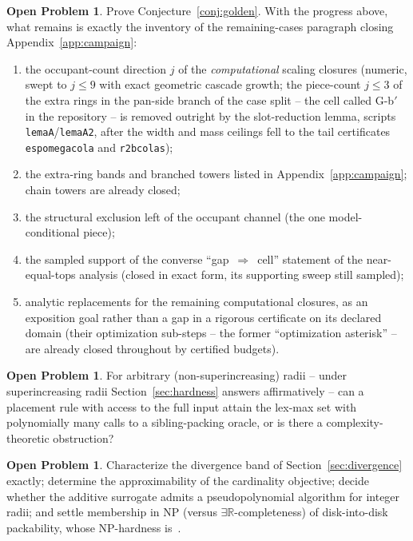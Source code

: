 \documentclass[11pt]{article}
\theoremstyle{definition}
\newtheorem{openproblem}[theorem]{Open Problem}
\begin{document}
\begin{openproblem}\label{op:assembly}
Prove Conjecture~\ref{conj:golden}. With the progress above, what
remains is exactly the inventory of the remaining-cases paragraph
closing Appendix~\ref{app:campaign}:
\begin{enumerate}
\item the occupant-count direction $j$ of the \emph{computational}
scaling closures (numeric, swept to $j\le9$ with exact geometric
cascade growth; the piece-count $j\le3$ of the extra rings in the
pan-side branch of the case split -- the cell called G-b$'$ in the
repository -- is removed outright by the slot-reduction lemma,
scripts \texttt{lemaA}/\texttt{lemaA2}, after the width and mass
ceilings fell to the tail certificates \texttt{espomegacola}
and \texttt{r2bcolas});
\item the extra-ring bands and branched towers listed in
Appendix~\ref{app:campaign}; chain towers are already closed;
\item the structural exclusion left of the occupant channel (the
one model-conditional piece);
\item the sampled support of the converse
``gap~$\Rightarrow$~cell'' statement of the near-equal-tops
analysis (closed in exact form, its supporting sweep still
sampled);
\item analytic replacements for the remaining computational
closures, as an exposition goal rather than a gap in a rigorous
certificate on its declared domain (their optimization sub-steps -- the former
``optimization asterisk'' -- are already closed throughout by
certified budgets).
\end{enumerate}
\end{openproblem}

\begin{openproblem}\label{op:oracle}
For arbitrary (non-superincreasing) radii -- under superincreasing radii
Section~\ref{sec:hardness} answers affirmatively -- can a placement rule
with access to the full input attain the lex-max set with
polynomially many calls to a sibling-packing oracle, or is there a
complexity-theoretic obstruction?
\end{openproblem}

\begin{openproblem}\label{op:misc}
Characterize the divergence band of Section~\ref{sec:divergence} exactly;
determine the approximability of the cardinality objective; decide whether
the additive surrogate admits a pseudopolynomial algorithm for integer
radii; and settle membership in NP (versus
$\exists\mathbb R$-completeness) of disk-into-disk packability, whose
NP-hardness is~\cite[Theorem~5.1]{FeketeKeldenichScheffer2019}.
\end{openproblem}
\end{document}
